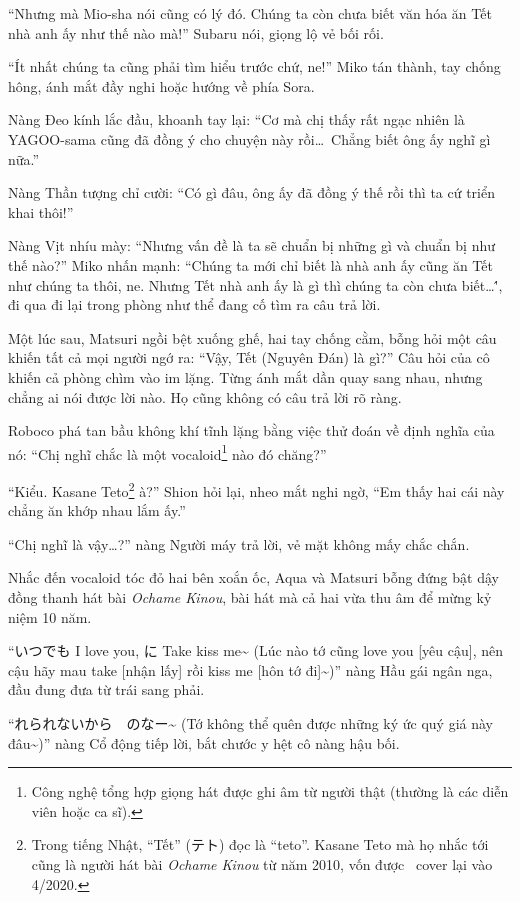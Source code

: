 \documentclass[../main.tex]{subfiles}
\begin{document}
``Nhưng mà Mio-sha nói cũng có lý đó. Chúng ta còn chưa biết văn hóa ăn Tết nhà anh ấy như thế nào mà!'' Subaru nói, giọng lộ vẻ bối rối.

``Ít nhất chúng ta cũng phải tìm hiểu trước chứ, ne!'' Miko tán thành, tay chống hông, ánh mắt đầy nghi hoặc hướng về phía Sora.

Nàng Đeo kính lắc đầu, khoanh tay lại: ``Cơ mà chị thấy rất ngạc nhiên là YAGOO-sama cũng đã đồng ý cho chuyện này rồi\dots\ Chẳng biết ông ấy nghĩ gì nữa.''

Nàng Thần tượng chỉ cười: ``Có gì đâu, ông ấy đã đồng ý thế rồi thì ta cứ triển khai thôi!''

Nàng Vịt nhíu mày: ``Nhưng vấn đề là ta sẽ chuẩn bị những gì và chuẩn bị như thế nào?'' Miko nhấn mạnh: ``Chúng ta mới chỉ biết là nhà anh ấy cũng ăn Tết như chúng ta thôi, ne. Nhưng Tết nhà anh ấy là gì thì chúng ta còn chưa biết\dots\'', đi qua đi lại trong phòng như thể đang cố tìm ra câu trả lời.

Một lúc sau, Matsuri ngồi bệt xuống ghế, hai tay chống cằm, bỗng hỏi một câu khiến tất cả mọi người ngớ ra: ``Vậy, Tết (Nguyên Đán) là gì?'' Câu hỏi của cô khiến cả phòng chìm vào im lặng. Từng ánh mắt dần quay sang nhau, nhưng chẳng ai nói được lời nào. Họ cũng không có câu trả lời rõ ràng.

Roboco phá tan bầu không khí tĩnh lặng bằng việc thử đoán về định nghĩa của nó: ``Chị nghĩ chắc là một vocaloid\footnote{Công nghệ tổng hợp giọng hát được ghi âm từ người thật (thường là các diễn viên hoặc ca sĩ).} nào đó chăng?''

``Kiểu. Kasane Teto\footnote{Trong tiếng Nhật, ``Tết'' (テト) đọc là ``teto''. Kasane Teto mà họ nhắc tới cũng là người hát bài \textit{Ochame Kinou} từ năm 2010, vốn được \hll\ cover lại vào 4/2020.} à?'' Shion hỏi lại, nheo mắt nghi ngờ, ``Em thấy hai cái này chẳng ăn khớp nhau lắm ấy.''

``Chị nghĩ là vậy\dots?'' nàng Người máy trả lời, vẻ mặt không mấy chắc chắn.

Nhắc đến vocaloid tóc đỏ hai bên xoắn ốc, Aqua và Matsuri bỗng đứng bật dậy đồng thanh hát bài \textit{Ochame Kinou}, bài hát mà cả hai vừa thu âm để mừng kỷ niệm 10 năm.

``いつでも I love you, に Take kiss me{\fotskip \~{}} (Lúc nào tớ cũng love you [yêu cậu], nên cậu hãy mau take [nhận lấy] rồi kiss me [hôn tớ đi]\~{})'' nàng Hầu gái ngân nga, đầu đung đưa từ trái sang phải.

``れられないから　のなー{\fotskip \~{}} (Tớ không thể quên được những ký ức quý giá này đâu\~{})'' nàng Cổ động tiếp lời, bắt chước y hệt cô nàng hậu bối.
\end{document}
